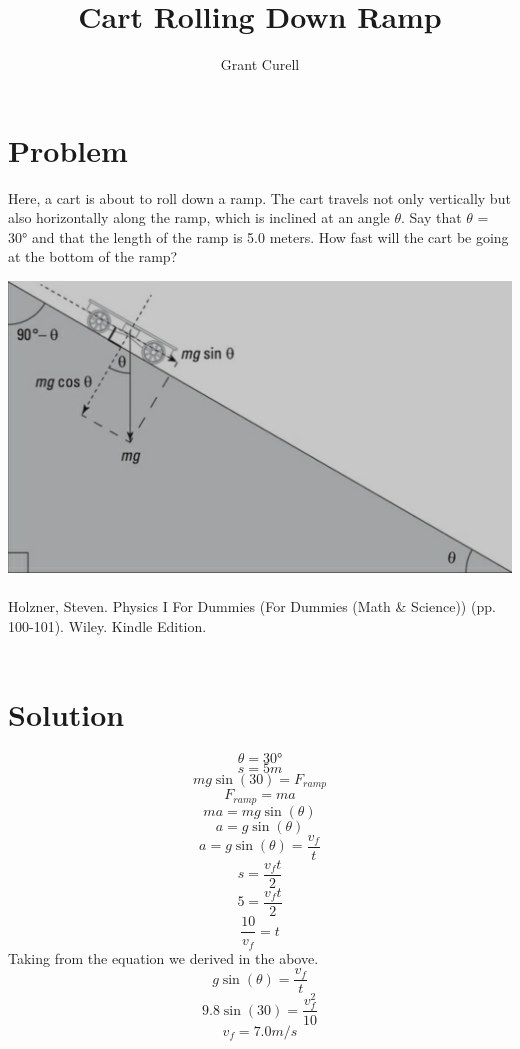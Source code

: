 \documentclass{article}
\title{Cart Rolling Down Ramp}
\author{Grant Curell}
\begin{document}
\maketitle{}
\section{Problem}
Here, a cart is about to roll down a ramp. The cart travels not only vertically but also horizontally along the ramp, which is inclined at an angle $\theta$. Say that $\theta$ = \ang{30} and that the length of the ramp is 5.0 meters. How fast will the cart be going at the bottom of the ramp?

\includegraphics[width=\columnwidth]{image}
\\\\
Holzner, Steven. Physics I For Dummies (For Dummies (Math \& Science)) (pp. 100-101). Wiley. Kindle Edition.
\\\\
\section{Solution}
\[ \theta=\ang{30} \]
\[ s=5m \]
\[ mg\sin(30)=F_{ramp} \]
\[ F_{ramp}=ma \]
\[ ma=mg\sin(\theta) \]
\[ a=g\sin(\theta) \]
\[ a=g\sin(\theta)=\frac{v_f}{t} \]
\[ s=\frac{v_ft}{2} \]
\[ 5=\frac{v_ft}{2} \]
\[ \frac{10}{v_f}=t \]
Taking from the equation we derived in the above.
\[ g\sin(\theta)=\frac{v_f}{t} \]
\[ 9.8\sin(30)=\frac{v_f^2}{10} \]
\[ v_f=7.0m/s \]
\end{document}
